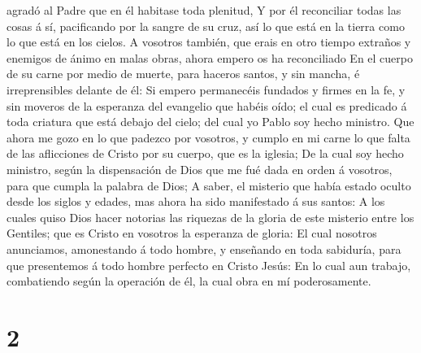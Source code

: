 agradó al Padre que en él habitase toda plenitud,  Y por
él reconciliar todas las cosas á sí, pacificando por la sangre de su
cruz, así lo que está en la tierra como lo que está en los cielos.
 A vosotros también, que erais en otro tiempo extraños y
enemigos de ánimo en malas obras, ahora empero os ha reconciliado
 En el cuerpo de su carne por medio de muerte, para
haceros santos, y sin mancha, é irreprensibles delante de él:
 Si empero permanecéis fundados y firmes en la fe, y sin
moveros de la esperanza del evangelio que habéis oído; el cual es
predicado á toda criatura que está debajo del cielo; del cual yo Pablo
soy hecho ministro.  Que ahora me gozo en lo que padezco
por vosotros, y cumplo en mi carne lo que falta de las aflicciones de
Cristo por su cuerpo, que es la iglesia;  De la cual soy
hecho ministro, según la dispensación de Dios que me fué dada en orden á
vosotros, para que cumpla la palabra de Dios;  A saber,
el misterio que había estado oculto desde los siglos y edades, mas ahora
ha sido manifestado á sus santos:  A los cuales quiso
Dios hacer notorias las riquezas de la gloria de este misterio entre los
Gentiles; que es Cristo en vosotros la esperanza de gloria:
 El cual nosotros anunciamos, amonestando á todo hombre,
y enseñando en toda sabiduría, para que presentemos á todo hombre
perfecto en Cristo Jesús:  En lo cual aun trabajo,
combatiendo según la operación de él, la cual obra en mí poderosamente.

\hypertarget{section-1}{%
\section{2}\label{section-1}}

